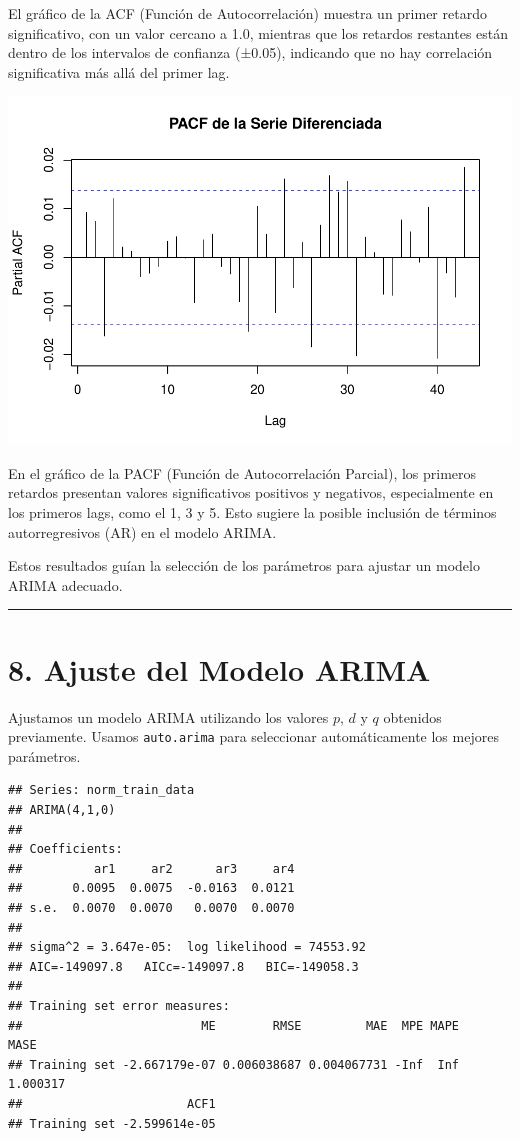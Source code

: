 \documentclass[
]{book}
\begin{document}
El gráfico de la ACF (Función de Autocorrelación) muestra un primer retardo significativo, con un valor cercano a 1.0, mientras que los retardos restantes están dentro de los intervalos de confianza (±0.05), indicando que no hay correlación significativa más allá del primer lag.

\includegraphics{bookdown_time_series_files/figure-latex/identify-parameters-2-1.pdf}

En el gráfico de la PACF (Función de Autocorrelación Parcial), los primeros retardos presentan valores significativos positivos y negativos, especialmente en los primeros lags, como el 1, 3 y 5. Esto sugiere la posible inclusión de términos autorregresivos (AR) en el modelo ARIMA.

Estos resultados guían la selección de los parámetros para ajustar un modelo ARIMA adecuado.

\begin{center}\rule{0.5\linewidth}{0.5pt}\end{center}

\section{8. Ajuste del Modelo ARIMA}\label{ajuste-del-modelo-arima}

Ajustamos un modelo ARIMA utilizando los valores \(p\), \(d\) y \(q\) obtenidos previamente. Usamos \texttt{auto.arima} para seleccionar automáticamente los mejores parámetros.

\begin{verbatim}
## Series: norm_train_data 
## ARIMA(4,1,0) 
## 
## Coefficients:
##          ar1     ar2      ar3     ar4
##       0.0095  0.0075  -0.0163  0.0121
## s.e.  0.0070  0.0070   0.0070  0.0070
## 
## sigma^2 = 3.647e-05:  log likelihood = 74553.92
## AIC=-149097.8   AICc=-149097.8   BIC=-149058.3
## 
## Training set error measures:
##                         ME        RMSE         MAE  MPE MAPE     MASE
## Training set -2.667179e-07 0.006038687 0.004067731 -Inf  Inf 1.000317
##                       ACF1
## Training set -2.599614e-05
\end{verbatim}
\end{document}

